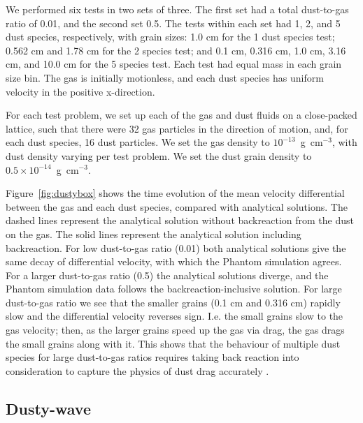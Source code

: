 \documentclass[fleqn,usenatbib]{mnras}
\begin{document}
We performed six tests in two sets of three. The first set had a total
dust-to-gas ratio of 0.01, and the second set 0.5. The tests within each set had
1, 2, and 5 dust species, respectively, with grain sizes: 1.0 cm for the 1 dust
species test; 0.562 cm and 1.78 cm for the 2 species test; and 0.1 cm, 0.316 cm,
1.0 cm, 3.16 cm, and 10.0 cm for the 5 species test. Each test had equal mass in
each grain size bin. The gas is initially motionless, and each dust species has
uniform velocity in the positive x-direction.

For each test problem, we set up each of the gas and dust fluids on a
close-packed lattice, such that there were 32 gas particles in the direction of
motion, and, for each dust species, 16 dust particles. We set the gas density to
\(10^{-13}\)~g~cm\({}^{-3}\), with dust density varying per test problem. We set
the dust grain density to \(0.5 \times 10^{-14}\)~g~cm\({}^{-3}\).

Figure~\ref{fig:dustybox} shows the time evolution of the mean velocity
differential between the gas and each dust species, compared with analytical
solutions. The dashed lines represent the analytical solution without
backreaction from the dust on the gas. The solid lines represent the analytical
solution including backreaction. For low dust-to-gas ratio (0.01) both
analytical solutions give the same decay of differential velocity, with which
the Phantom simulation agrees. For a larger dust-to-gas ratio (0.5) the
analytical solutions diverge, and the Phantom simulation data follows the
backreaction-inclusive solution. For large dust-to-gas ratio we see that the
smaller grains (0.1 cm and 0.316 cm) rapidly slow and the differential velocity
reverses sign. I.e. the small grains slow to the gas velocity; then, as the
larger grains speed up the gas via drag, the gas drags the small grains along
with it. This shows that the behaviour of multiple dust species for large
dust-to-gas ratios requires taking back reaction into consideration to capture
the physics of dust drag accurately
\citep{Gonzalez2017MNRAS.467.1984G,Dipierro2018MNRAS.479.4187D}.

\subsection{Dusty-wave}
\end{document}
